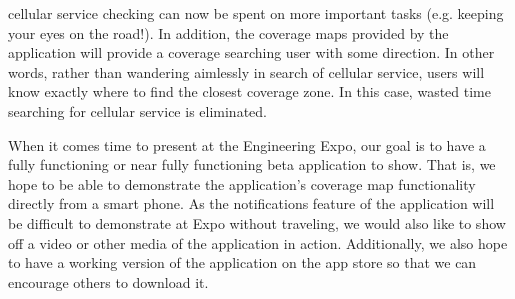\documentclass[letterpaper,10pt,draftclsnofoot,onecolumn]{IEEEtran}
\begin{document}
cellular service checking can now be spent on more important tasks (e.g. keeping
your eyes on the road!). In addition, the coverage maps provided by the
application will provide a coverage searching user with some direction. In other
words, rather than wandering aimlessly in search of cellular service, users will
know exactly where to find the closest coverage zone. In this case, wasted time
searching for cellular service is eliminated.\par
When it comes time to present at the Engineering Expo, our goal is to have a
fully functioning or near fully functioning beta application to show. That is,
we hope to be able to demonstrate the application's coverage map functionality
directly from a smart phone. As the notifications feature of the application will be difficult to demonstrate at Expo without traveling, we would also like
to show off a video or other media of the application in action. Additionally,
we also hope to have a working version of the application on the app store so
that we can encourage others to download it.\par
\end{document}
